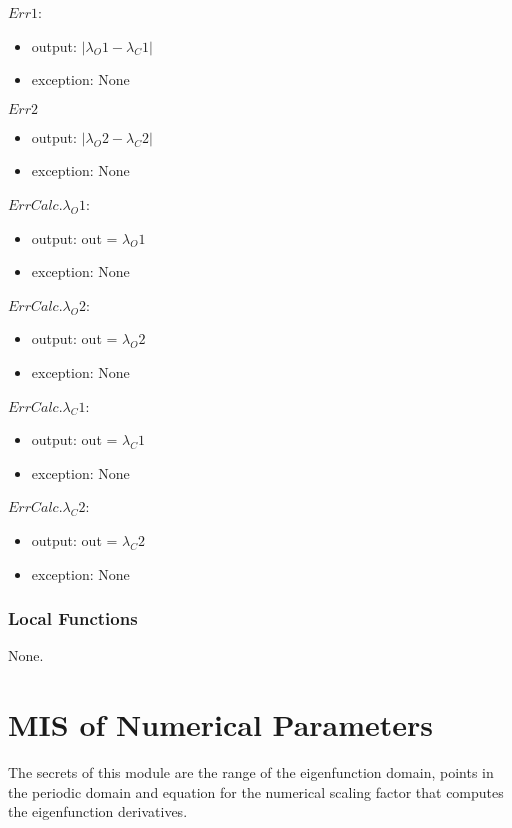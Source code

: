 \documentclass[12pt, titlepage]{article}
\begin{document}
$Err1$:
\begin{itemize}
	\item output: $| \lambda_O1 - \lambda_C1| $ 
	\item exception: None
\end{itemize}


\noindent $Err2$
\begin{itemize} 
	\item output: $| \lambda_O2 - \lambda_C2| $ 
	\item exception: None
\end{itemize} 

\noindent $ErrCalc.\lambda_O1$:
\begin{itemize}
	\item output: out = $\lambda_O1$
	\item exception: None 
\end{itemize}

\noindent $ErrCalc.\lambda_O2$:
\begin{itemize}
	\item output: out = $\lambda_O2$
	\item exception: None
\end{itemize}

\noindent $ErrCalc.\lambda_C1$:
\begin{itemize}
	\item output: out = $\lambda_C1$
	\item exception: None
\end{itemize}

\noindent $ErrCalc.\lambda_C2$:
\begin{itemize}
	\item output: out = $\lambda_C2$ 
	\item exception: None
\end{itemize} 

\subsubsection{Local Functions} 

None. 

\newpage 

\section{MIS of Numerical Parameters} \label{MNP}

The secrets of this module are the range of the eigenfunction domain, points in 
the 
periodic domain and equation for the numerical scaling factor that computes 
the 
eigenfunction derivatives. 
\end{document}
